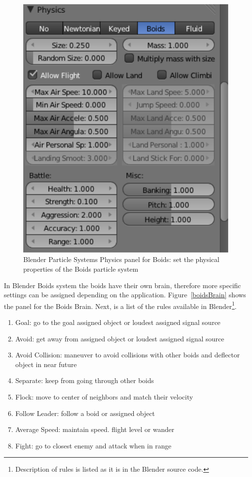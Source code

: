 \begin{figure}[htbp]
\begin{center}
\includegraphics[scale = 0.65]{figures/boidsPhysics.pdf} 
\caption{Blender Particle Systems Physics panel for Boids: set the physical properties of the Boids particle system}
\label{boidsPhysics}
\end{center}
\end{figure}

In Blender Boids system the boids have their own brain, therefore more specific settings can be assigned depending on the application. Figure~\ref{boidsBrain} shows the panel for the Boids Brain. Next, is a list of the rules available in Blender\footnote{Description of rules is listed as it is in the Blender source code.}.

\begin{enumerate}
\item{Goal: go to the goal assigned object or loudest assigned signal source}
\item{Avoid: get away from assigned object or loudest assigned signal source}
\item{Avoid Collision: maneuver to avoid collisions with other boids and deflector object in near future}
\item{Separate: keep from going through other boids}
\item{Flock: move to center of neighbors and match their velocity}
\item{Follow Leader: follow a boid or assigned object}
\item{Average Speed: maintain speed. flight level or wander}
\item{Fight: go to closest enemy and attack when in range}
\end{enumerate}

